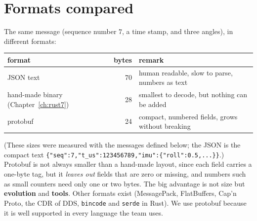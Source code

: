 \section*{Formats compared}
The same message (sequence number $7$, a time stamp, and three angles), in different formats:
\begin{center}
\renewcommand{\arraystretch}{1.2}
\begin{tabular}{lrp{6.5cm}}
\textbf{format} & \textbf{bytes} & \textbf{remark}\\ \hline
JSON text & 70 & human readable, slow to parse, numbers as text\\
hand-made binary (Chapter~\ref{ch:rust7}) & 28 & smallest to decode, but nothing can be added\\
protobuf & 24 & compact, numbered fields, grows without breaking\\
\end{tabular}
\end{center}
(These sizes were measured with the messages defined below; the JSON is the compact text \verb!{"seq":7,"t_us":123456789,"imu":{"roll":0.5,...}}!.) Protobuf is not always smaller than a hand-made layout, since each field carries a one-byte tag, but it \emph{leaves out} fields that are zero or missing, and numbers such as small counters need only one or two bytes. The big advantage is not size but \textbf{evolution} and \textbf{tools}. Other formats exist (MessagePack, FlatBuffers, Cap'n Proto, the CDR of DDS, \verb!bincode! and \verb!serde! in Rust). We use protobuf because it is well supported in every language the team uses.

